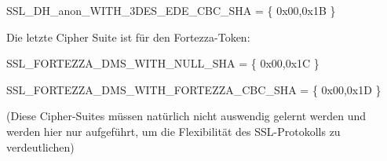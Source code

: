 \documentclass[a4paper]{article}
\begin{document}
\begin{multicols}{3}
\begin{itemize*}
\begin{itemize*}
\begin{itemize*}
                        \item SSL\_DH\_anon\_WITH\_3DES\_EDE\_CBC\_SHA = \{ 0x00,0x1B \}
                  \end{itemize*}
                  \item       Die letzte Cipher Suite ist für den Fortezza-Token:
                  \begin{itemize*}
                        \item SSL\_FORTEZZA\_DMS\_WITH\_NULL\_SHA = \{ 0x00,0x1C \}
                        \item SSL\_FORTEZZA\_DMS\_WITH\_FORTEZZA\_CBC\_SHA = \{ 0x00,0x1D \}
                  \end{itemize*}
            \end{itemize*}
            (Diese Cipher-Suites müssen natürlich nicht auswendig gelernt werden und
            werden hier nur aufgeführt, um die Flexibilität des SSL-Protokolls zu
            verdeutlichen)


\end{itemize*}
\end{multicols}
\end{document}

